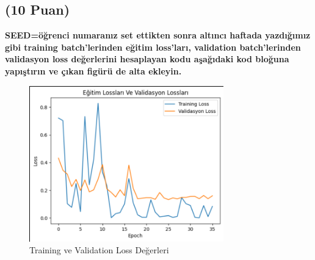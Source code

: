 \documentclass[11pt]{article}
\begin{document}
\subsection{(10 Puan)} \textbf{SEED=öğrenci numaranız set ettikten sonra altıncı haftada yazdığımız gibi training batch'lerinden eğitim loss'ları, validation batch'lerinden validasyon loss değerlerini hesaplayan kodu aşağıdaki kod bloğuna yapıştırın ve çıkan figürü de alta ekleyin.}

\begin{figure}[ht!]
    \centering
    \includegraphics[width=0.75\textwidth]{train-validation-loss.png}
    \caption{Training ve Validation Loss Değerleri}
    \label{fig:my_pic}
\end{figure}
\end{document}
